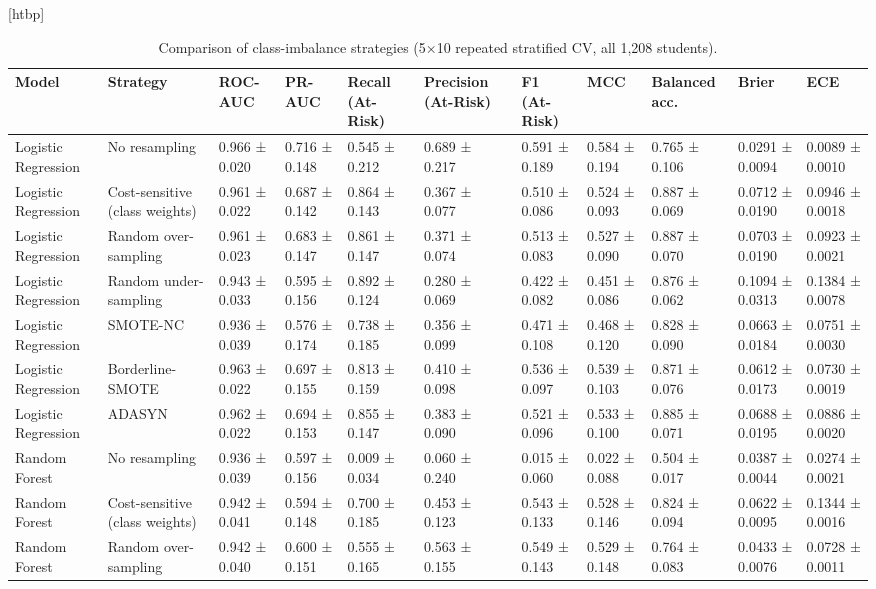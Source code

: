 \begin{table}
\small[htbp]
\caption{Comparison of class-imbalance strategies (5×10 repeated stratified CV, all 1,208 students).}
\label{tab:S05_imbalance_strategies}
\begin{tabular}{lllllllllll}
\toprule
Model & Strategy & ROC-AUC & PR-AUC & Recall (At-Risk) & Precision (At-Risk) & F1 (At-Risk) & MCC & Balanced acc. & Brier & ECE \\
\midrule
Logistic Regression & No resampling & 0.966 ± 0.020 & 0.716 ± 0.148 & 0.545 ± 0.212 & 0.689 ± 0.217 & 0.591 ± 0.189 & 0.584 ± 0.194 & 0.765 ± 0.106 & 0.0291 ± 0.0094 & 0.0089 ± 0.0010 \\
Logistic Regression & Cost-sensitive (class weights) & 0.961 ± 0.022 & 0.687 ± 0.142 & 0.864 ± 0.143 & 0.367 ± 0.077 & 0.510 ± 0.086 & 0.524 ± 0.093 & 0.887 ± 0.069 & 0.0712 ± 0.0190 & 0.0946 ± 0.0018 \\
Logistic Regression & Random over-sampling & 0.961 ± 0.023 & 0.683 ± 0.147 & 0.861 ± 0.147 & 0.371 ± 0.074 & 0.513 ± 0.083 & 0.527 ± 0.090 & 0.887 ± 0.070 & 0.0703 ± 0.0190 & 0.0923 ± 0.0021 \\
Logistic Regression & Random under-sampling & 0.943 ± 0.033 & 0.595 ± 0.156 & 0.892 ± 0.124 & 0.280 ± 0.069 & 0.422 ± 0.082 & 0.451 ± 0.086 & 0.876 ± 0.062 & 0.1094 ± 0.0313 & 0.1384 ± 0.0078 \\
Logistic Regression & SMOTE-NC & 0.936 ± 0.039 & 0.576 ± 0.174 & 0.738 ± 0.185 & 0.356 ± 0.099 & 0.471 ± 0.108 & 0.468 ± 0.120 & 0.828 ± 0.090 & 0.0663 ± 0.0184 & 0.0751 ± 0.0030 \\
Logistic Regression & Borderline-SMOTE & 0.963 ± 0.022 & 0.697 ± 0.155 & 0.813 ± 0.159 & 0.410 ± 0.098 & 0.536 ± 0.097 & 0.539 ± 0.103 & 0.871 ± 0.076 & 0.0612 ± 0.0173 & 0.0730 ± 0.0019 \\
Logistic Regression & ADASYN & 0.962 ± 0.022 & 0.694 ± 0.153 & 0.855 ± 0.147 & 0.383 ± 0.090 & 0.521 ± 0.096 & 0.533 ± 0.100 & 0.885 ± 0.071 & 0.0688 ± 0.0195 & 0.0886 ± 0.0020 \\
Random Forest & No resampling & 0.936 ± 0.039 & 0.597 ± 0.156 & 0.009 ± 0.034 & 0.060 ± 0.240 & 0.015 ± 0.060 & 0.022 ± 0.088 & 0.504 ± 0.017 & 0.0387 ± 0.0044 & 0.0274 ± 0.0021 \\
Random Forest & Cost-sensitive (class weights) & 0.942 ± 0.041 & 0.594 ± 0.148 & 0.700 ± 0.185 & 0.453 ± 0.123 & 0.543 ± 0.133 & 0.528 ± 0.146 & 0.824 ± 0.094 & 0.0622 ± 0.0095 & 0.1344 ± 0.0016 \\
Random Forest & Random over-sampling & 0.942 ± 0.040 & 0.600 ± 0.151 & 0.555 ± 0.165 & 0.563 ± 0.155 & 0.549 ± 0.143 & 0.529 ± 0.148 & 0.764 ± 0.083 & 0.0433 ± 0.0076 & 0.0728 ± 0.0011 \\

\end{tabular}
\end{table}
